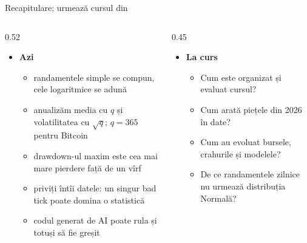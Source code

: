 \begin{frame}{Recapitulare; urmează cursul din }
\itemsize{\small}
\begin{columns}[T]
\begin{column}{0.52\textwidth}
\begin{itemize}
    \item \textbf{Azi}
    \begin{itemize}
        \item randamentele simple se compun, cele logaritmice se adună
        \item anualizăm media cu $q$ și volatilitatea cu $\sqrt{q}$; $q = 365$ pentru Bitcoin
        \item drawdown-ul maxim este cea mai mare pierdere față de un vîrf
        \item priviți întîi datele: un singur bad tick poate domina o statistică
        \item codul generat de AI poate rula și totuși să fie greșit
    \end{itemize}
\end{itemize}
\end{column}
\begin{column}{0.45\textwidth}
\begin{itemize}
    \item \textbf{La curs}
    \begin{itemize}
        \item Cum este organizat și evaluat cursul?
        \item Cum arată piețele din 2026 în date?
        \item Cum au evoluat bursele, crahurile și modelele?
        \item De ce randamentele zilnice nu urmează distribuția Normală?
    \end{itemize}
\end{itemize}
\end{column}
\end{columns}
\end{frame}


